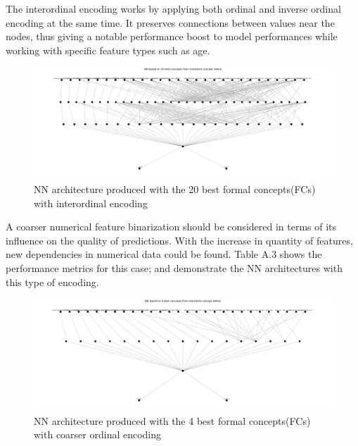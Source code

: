 \documentclass[14pt,a4paper]{extarticle}
\begin{document}
	The interordinal encoding works by applying both ordinal and inverse ordinal encoding at the same time. It preserves connections between values near the nodes, thus giving a notable performance boost to model performances while working with specific feature types such as age.
	
	\newpage
	
	\begin{figure}[h]
		\centering
		\includegraphics[width=\textwidth]{media/employees/NN_architecture_20concepts.png}
		\caption{NN architecture produced with the 20 best formal concepts(FCs) with interordinal encoding}
		\label{fig:20concepts-inter}
	\end{figure}
	
	 A coarser numerical feature binarization should be considered in terms of its influence on the quality of predictions. With the increase in quantity of features, new dependencies in numerical data could be found. Table A.3 shows the performance metrics for this case;  and  demonstrate the NN architectures with this type of encoding.
	
	\begin{figure}[h]
		\centering
		\includegraphics[width=\textwidth]{media/employees/NN_architecture_4concepts.png}
		\caption{NN architecture produced with the 4 best formal concepts(FCs) with coarser ordinal encoding}
		\label{fig:4concepts-coarse}
	\end{figure}
	
	\newpage
	
\end{document}
